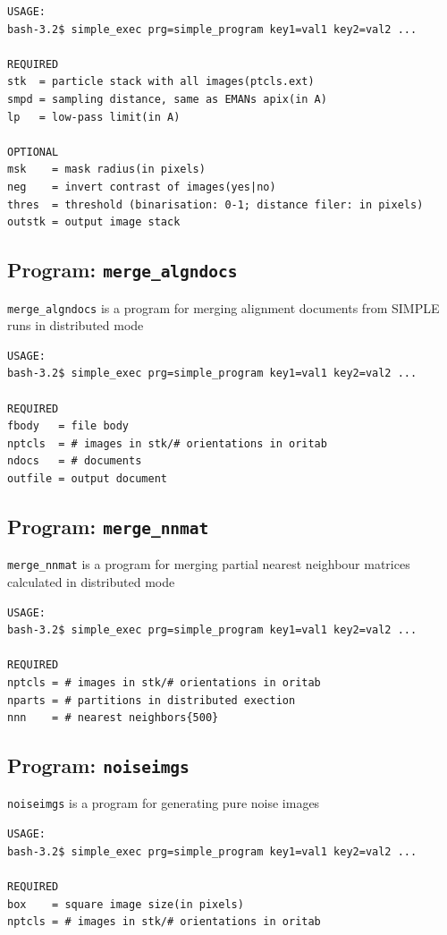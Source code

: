 \documentclass[a4paper,11pt]{article}
\newcommand{\prgname}[1]{\textcolor{NavyBlue}{\texttt{#1}}}
\begin{document}
\begin{verbatim}
USAGE:
bash-3.2$ simple_exec prg=simple_program key1=val1 key2=val2 ...

REQUIRED
stk  = particle stack with all images(ptcls.ext)
smpd = sampling distance, same as EMANs apix(in A)
lp   = low-pass limit(in A)

OPTIONAL
msk    = mask radius(in pixels)
neg    = invert contrast of images(yes|no)
thres  = threshold (binarisation: 0-1; distance filer: in pixels)
outstk = output image stack
\end{verbatim}

\subsection{Program: \prgname{merge\_algndocs}}
\label{merge_algndocs}
\prgname{merge\_algndocs} is a program for merging alignment documents from SIMPLE runs in distributed mode

\begin{verbatim}
USAGE:
bash-3.2$ simple_exec prg=simple_program key1=val1 key2=val2 ...

REQUIRED
fbody   = file body
nptcls  = # images in stk/# orientations in oritab
ndocs   = # documents
outfile = output document
\end{verbatim}

\subsection{Program: \prgname{merge\_nnmat}}
\label{merge_nnmat}
\prgname{merge\_nnmat} is a program for merging partial nearest neighbour matrices calculated in distributed mode

\begin{verbatim}
USAGE:
bash-3.2$ simple_exec prg=simple_program key1=val1 key2=val2 ...

REQUIRED
nptcls = # images in stk/# orientations in oritab
nparts = # partitions in distributed exection
nnn    = # nearest neighbors{500}
\end{verbatim}

\subsection{Program: \prgname{noiseimgs}}
\label{noiseimgs}
\prgname{noiseimgs} is a program for generating pure noise images

\begin{verbatim}
USAGE:
bash-3.2$ simple_exec prg=simple_program key1=val1 key2=val2 ...

REQUIRED
box    = square image size(in pixels)
nptcls = # images in stk/# orientations in oritab
\end{verbatim}
\end{document}
